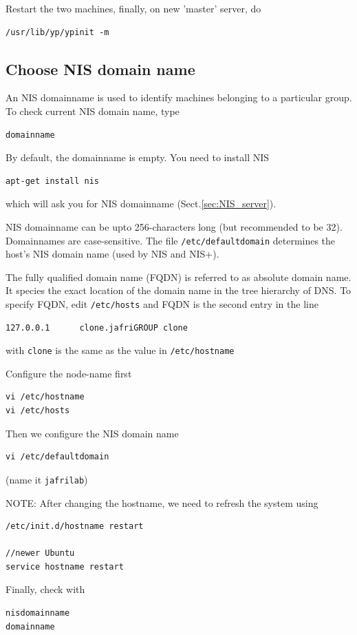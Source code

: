 Restart the two machines, finally, on new 'master' server, do
\begin{verbatim}
/usr/lib/yp/ypinit -m
\end{verbatim}




\subsection{Choose NIS domain name}
\label{sec:NIS_domainname}

An NIS domainname is used to identify machines belonging to a particular group.
To check current NIS domain name, type
\begin{verbatim}
domainname
\end{verbatim}
By default, the domainname is empty. You need to install NIS 
\begin{verbatim}
apt-get install nis
\end{verbatim}
which will ask you for NIS domainname (Sect.\ref{sec:NIS_server}).

NIS domainname can be upto 256-characters long (but recommended to be 32).
Domainnames are case-sensitive.  The file \verb!/etc/defaultdomain! determines
the host's NIS domain name (used by NIS and NIS+). 

\begin{mdframed}
The fully qualified domain name (FQDN) is referred to as absolute domain name.
It species the exact location of the domain name in the tree hierarchy of DNS.
To specify FQDN, edit \verb!/etc/hosts! and FQDN is the second entry in the line
\begin{verbatim}
127.0.0.1      clone.jafriGROUP clone
\end{verbatim}
with \verb!clone! is the same as the value in \verb!/etc/hostname!
\end{mdframed}


Configure the node-name first
\begin{verbatim}
vi /etc/hostname
vi /etc/hosts
\end{verbatim}
Then we configure the NIS domain name
\begin{verbatim}
vi /etc/defaultdomain
\end{verbatim}
(name it \verb!jafrilab!)

NOTE: After changing the hostname, we need to refresh the system using
\begin{verbatim}
/etc/init.d/hostname restart

//newer Ubuntu
service hostname restart
\end{verbatim}
Finally, check with
\begin{verbatim}
nisdomainname
domainname
\end{verbatim}


